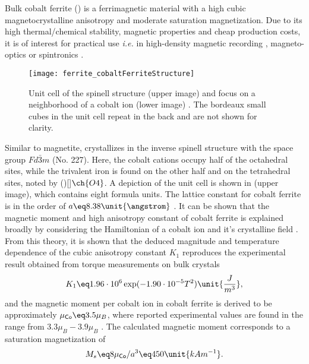 \documentclass[\main/dresen_thesis.tex]{subfiles}
\begin{document}
  Bulk cobalt ferrite () is a ferrimagnetic material with a high cubic magnetocrystalline anisotropy and moderate saturation magnetization.
  Due to its high thermal/chemical stability, magnetic properties and cheap production costs, it is of interest for practical use \textit{i.e.} in high-density magnetic recording \cite{Wu_2014_Monol}, magneto-optics \cite{Jung_2005_CoFe2} or spintronics \cite{Ramos_2007_Roomt}.

  \begin{figure}[tb]
    \centering
    \texttt{[image: ferrite\_cobaltFerriteStructure]}
    \caption{\label{fig:theoreticalBackground:ferrites:cofe2o4Structure}Unit cell of the spinell structure  (upper image) \cite{Sickafus_1999_Struc} and focus on a neighborhood of a cobalt ion (lower image) \cite{Tachiki_1960_Origi}. The bordeaux small cubes in the unit cell repeat in the back and are not shown for clarity.}
  \end{figure}

  Similar to magnetite,  crystallizes in the inverse spinell structure with the space group $Fd\bar{3}m$ (No. 227).
  Here, the cobalt cations occupy half of the octahedral sites, while the trivalent iron is found on the other half and on the tetrahedral sites, noted by ()[]$\ch{O4}$.
  A depiction of the unit cell is shown in  (upper image), which contains eight formula units.
  The lattice constant for cobalt ferrite is in the order of $a \eq 8.38 \unit{\angstrom}$ \cite{Goldman_1999_Cryst}.
  It can be shown that the magnetic moment and high anisotropy constant of cobalt ferrite is explained broadly by considering the Hamiltonian of a cobalt ion and it's crystalline field \cite{Slonczewski_1958_Origi, Tachiki_1960_Origi} .
  From this theory, it is shown that the deduced magnitude and temperature dependence of the cubic anisotropy constant $K_1$ reproduces the experimental result obtained from torque measurements on bulk crystals \cite{Shenker_1957_Magne}
  \begin{align}
    K_1 \eq 1.96 \cdot 10^6 \exp(-1.90 \cdot 10^{-5} T^2) \unit{\frac{J}{m^3}},
  \end{align}
  and the magnetic moment per cobalt ion in cobalt ferrite is derived to be approximately $\mu_\textsf{Co} \eq 3.5 \mu_B$, where reported experimental values are found in the range from $3.3 \mu_B - 3.9 \mu_B$ \cite{Tachiki_1960_Origi}.
  The calculated magnetic moment corresponds to a saturation magnetization of
  \begin{align}
    M_s \eq 8\mu_\textsf{Co}/a^3 \eq 450 \unit{kAm^{-1}}.
  \end{align}
\end{document}
